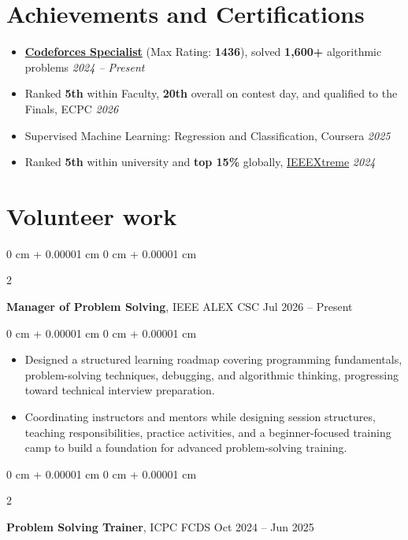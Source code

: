 \documentclass[9pt, letterpaper]{extarticle}
\newenvironment{highlights}{
    \begin{itemize}[
        topsep=0.06 cm,
        parsep=0.06 cm,
        partopsep=0pt,
        itemsep=0pt,
        leftmargin=0 cm + 10pt
    ]
}{
    \end{itemize}
} %
\newenvironment{onecolentry}{
    \begin{adjustwidth}{
        0 cm + 0.00001 cm
    }{
        0 cm + 0.00001 cm
    }
}{
    \end{adjustwidth}
} %
\newenvironment{twocolentry}[2][]{
    \onecolentry
    \def\secondColumn{#2}
    \setcolumnwidth{\fill, 4.5 cm}
    \begin{paracol}{2}
}{
    \switchcolumn \raggedleft \secondColumn
    \end{paracol}
    \endonecolentry
} %
\begin{document}
    \section{Achievements and Certifications}
    \begin{highlights}
        \item {\href{https://codeforces.com/profile/3blatif}{\textbf{Codeforces Specialist}} (Max Rating: \textbf{1436}), solved \textbf{1,600+} algorithmic problems \hfill \textit{2024 -- Present}}
        \item {Ranked \textbf{5th} within Faculty, \textbf{20th} overall on contest day, and qualified to the Finals, ECPC \hfill \textit{2026}}
        \item {Supervised Machine Learning: Regression and Classification, Coursera \hfill \textit{2025}}
        \item {Ranked \textbf{5th} within university and \textbf{top 15\%} globally, \href{https://drive.google.com/file/d/1FhwVgWG2PMwcIJONQGilJhHKcFkGmTxr/view?usp=sharing}{IEEEXtreme} \hfill \textit{2024}}
    \end{highlights}


    \section{Volunteer work}

        \begin{twocolentry}{
            Jul 2026 -- Present
        }
            \textbf{Manager of Problem Solving}, IEEE ALEX CSC\end{twocolentry}

        \begin{onecolentry}
            \begin{highlights}
                \item Designed a structured learning roadmap covering programming fundamentals, problem-solving techniques, debugging, and algorithmic thinking, progressing toward technical interview preparation.
                \item Coordinating instructors and mentors while designing session structures, teaching responsibilities, practice activities, and a beginner-focused training camp to build a foundation for advanced problem-solving training.
            \end{highlights}
        \end{onecolentry}

        \begin{twocolentry}{
            Oct 2024 -- Jun 2025
        }
            \textbf{Problem Solving Trainer}, ICPC FCDS\end{twocolentry}
\end{document}
